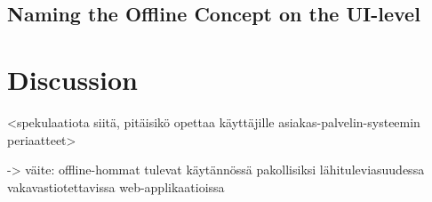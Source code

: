 \subsection{Naming the Offline Concept on the UI-level}



\section{Discussion}

<spekulaatiota siitä, pitäisikö opettaa käyttäjille asiakas-palvelin-systeemin periaatteet>


-> väite: offline-hommat tulevat käytännössä pakollisiksi lähituleviasuudessa vakavastiotettavissa web-applikaatioissa






